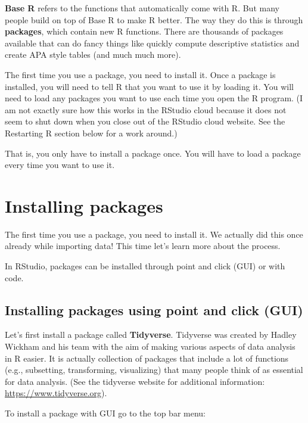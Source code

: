 \documentclass[
]{book}
\begin{document}
\textbf{Base R} refers to the functions that automatically come with R. But many people build on top of Base R to make R better. The way they do this is through \textbf{packages}, which contain new R functions. There are thousands of packages available that can do fancy things like quickly compute descriptive statistics and create APA style tables (and much much more).

The first time you use a package, you need to install it. Once a package is installed, you will need to tell R that you want to use it by loading it. You will need to load any packages you want to use each time you open the R program. (I am not exactly sure how this works in the RStudio cloud because it does not seem to shut down when you close out of the RStudio cloud website. See the Restarting R section below for a work around.)

That is, you only have to install a package once. You will have to load a package every time you want to use it.

\hypertarget{installing-packages}{%
\section{Installing packages}\label{installing-packages}}

The first time you use a package, you need to install it. We actually did this once already while importing data! This time let's learn more about the process.

In RStudio, packages can be installed through point and click (GUI) or with code.

\hypertarget{installing-packages-using-point-and-click-gui}{%
\subsection{Installing packages using point and click (GUI)}\label{installing-packages-using-point-and-click-gui}}

Let's first install a package called \textbf{Tidyverse}. Tidyverse was created by Hadley Wickham and his team with the aim of making various aspects of data analysis in R easier. It is actually collection of packages that include a lot of functions (e.g., subsetting, transforming, visualizing) that many people think of as essential for data analysis. (See the tidyverse website for additional information: \url{https://www.tidyverse.org}).

To install a package with GUI go to the top bar menu:
\end{document}
